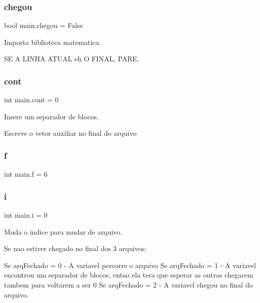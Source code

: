\mbox{\label{namespacemain_a8f970243fb58a2da4017c046ef996563}} 
\subsubsection{\texorpdfstring{chegou}{chegou}}
{\footnotesize\ttfamily bool main.\+chegou = False}



Importa biblioteca matematica. 

SE A L\+I\+N\+HA A\+T\+U\+AL eh O F\+I\+N\+AL, P\+A\+RE. \mbox{\label{namespacemain_a4cda66d1bad44953d624f658802db676}} 
\subsubsection{\texorpdfstring{cont}{cont}}
{\footnotesize\ttfamily int main.\+cont = 0}



Insere um separador de blocos. 

Escreve o vetor auxiliar no final do arquivo \mbox{\label{namespacemain_a8a078ca3f8b803e56f253dbe7a70d93c}} 
\subsubsection{\texorpdfstring{f}{f}}
{\footnotesize\ttfamily int main.\+f = 6}

\mbox{\label{namespacemain_ade6e2febf33b88a767c2e85902add210}} 
\subsubsection{\texorpdfstring{i}{i}}
{\footnotesize\ttfamily int main.\+i = 0}



Muda o indice para mudar de arquivo. 

Se nao estiver chegado no final dos 3 arquivos\+:

Se arq\+Fechado = 0 -\/ A variavel percorre o arquivo Se arq\+Fechado = 1 -\/ A variavel encontrou um separador de blocos, entao ela tera que esperar as outras chegarem tambem para voltarem a ser 0 Se arq\+Fechado = 2 -\/ A variavel chegou no final do arquivo.


